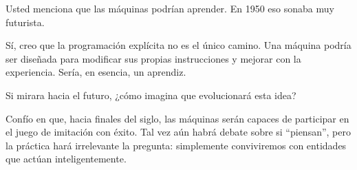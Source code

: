 \begin{description}[leftmargin=0cm, labelsep=0.5cm]
    \item[\textbf{Entrevistador:}] Usted menciona que las máquinas podrían aprender. En 1950 eso sonaba muy futurista.

    \item[\textbf{Turing:}] Sí, creo que la programación explícita no es el único camino. Una máquina podría ser diseñada para modificar sus propias instrucciones y mejorar con la experiencia. Sería, en esencia, un aprendiz.

    \item[\textbf{Entrevistador:}] Si mirara hacia el futuro, ¿cómo imagina que evolucionará esta idea?

    \item[\textbf{Turing:}] Confío en que, hacia finales del siglo, las máquinas serán capaces de participar en el juego de imitación con éxito. Tal vez aún habrá debate sobre si “piensan”, pero la práctica hará irrelevante la pregunta: simplemente conviviremos con entidades que actúan inteligentemente.

\end{description}

